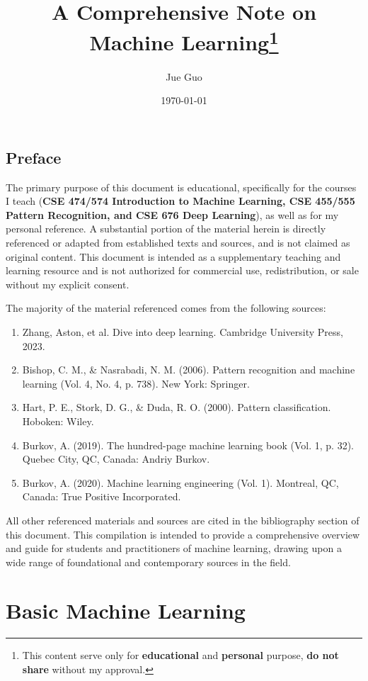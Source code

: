 \documentclass[10pt]{book}
\title{A Comprehensive Note on Machine Learning\footnote{This content serve only for \textbf{educational} and \textbf{personal} purpose, \textbf{do not share} without my approval.}}
\author{Jue Guo}
\date{\today}
\begin{document}
\frontmatter
\maketitle
\tableofcontents
\chapter*{Preface}

The primary purpose of this document is educational, specifically for the courses I teach (\textbf{CSE 474/574 Introduction to Machine Learning, CSE 455/555 Pattern Recognition, and CSE 676 Deep Learning}), as well as for my personal reference. A substantial portion of the material herein is directly referenced or adapted from established texts and sources, and is not claimed as original content. This document is intended as a supplementary teaching and learning resource and is not authorized for commercial use, redistribution, or sale without my explicit consent.

The majority of the material referenced comes from the following sources:

{
\renewcommand{\labelenumi}{[\theenumi]}
\setcounter{enumi}{0} %

\begin{enumerate}
	\item Zhang, Aston, et al. Dive into deep learning. Cambridge University Press, 2023.
	\item Bishop, C. M., \& Nasrabadi, N. M. (2006). Pattern recognition and machine learning (Vol. 4, No. 4, p. 738). New York: Springer.
	\item Hart, P. E., Stork, D. G., \& Duda, R. O. (2000). Pattern classification. Hoboken: Wiley.
	\item Burkov, A. (2019). The hundred-page machine learning book (Vol. 1, p. 32). Quebec City, QC, Canada: Andriy Burkov.
	\item Burkov, A. (2020). Machine learning engineering (Vol. 1). Montreal, QC, Canada: True Positive Incorporated.
\end{enumerate}
}

All other referenced materials and sources are cited in the bibliography section of this document. This compilation is intended to provide a comprehensive overview and guide for students and practitioners of machine learning, drawing upon a wide range of foundational and contemporary sources in the field.

\mainmatter
\part{Basic Machine Learning}


\end{document}
